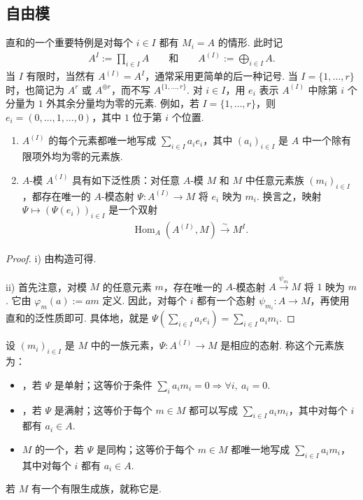 \subsection{自由模}\label{sec:galois-1-3-6}
直和的一个重要特例是对每个 $i\in I$ 都有 $M_i=A$ 的情形. 此时记
\begin{align*}
A^I:=\prod_{i\in I}A\qquad\text{和}\qquad A^{(I)}:=\bigoplus_{i\in I}A.
\end{align*}
当 $I$ 有限时，当然有 $A^{(I)}=A^I$，通常采用更简单的后一种记号. 当 $I=\{1,\ldots,r\}$ 时，也简记为 $A^r$ 或 $A^{\oplus r}$，而不写 $A^{\{1,\ldots,r\}}$. 对 $i\in I$，用 $e_i$ 表示 $A^{(I)}$ 中除第 $i$ 个分量为 $1$ 外其余分量均为零的元素. 例如，若 $I=\{1,\ldots,r\}$，则 $e_i=(0,\ldots,1,\ldots,0)$，其中 $1$ 位于第 $i$ 个位置.
\begin{proposition*}
\begin{enumerate}[label=\roman*)]
\item $A^{(I)}$ 的每个元素都唯一地写成 $\sum_{i\in I}a_ie_i$，其中 $(a_i)_{i\in I}$ 是 $A$ 中一个除有限项外均为零的元素族.
\item $A$-模 $A^{(I)}$ 具有如下泛性质：对任意 $A$-模 $M$ 和 $M$ 中任意元素族 $(m_i)_{i\in I}$，都存在唯一的 $A$-模态射 $\Psi\colon A^{(I)}\longrightarrow M$ 将 $e_i$ 映为 $m_i$. 换言之，映射 $\Psi\mapsto(\Psi(e_i))_{i\in I}$ 是一个双射
\begin{align*}
\operatorname{Hom}_A(A^{(I)},M)\xrightarrow{\sim}M^I.
\end{align*}
\end{enumerate}
\end{proposition*}
\begin{proof}
i) 由构造可得.

ii) 首先注意，对模 $M$ 的任意元素 $m$，存在唯一的 $A$-模态射 $A\xrightarrow{\psi_m}M$ 将 $1$ 映为 $m$. 它由 $\varphi_m(a):=am$ 定义. 因此，对每个 $i$ 都有一个态射 $\psi_{m_i}\colon A\longrightarrow M$，再使用直和的泛性质即可. 具体地，就是 $\Psi(\sum_{i\in I}a_ie_i)=\sum_{i\in I}a_im_i$.
\end{proof}
\begin{definition*}
设 $(m_i)_{i\in I}$ 是 $M$ 中的一族元素，$\Psi\colon A^{(I)}\longrightarrow M$ 是相应的态射. 称这个元素族为：
\begin{itemize}
\item {}，若 $\Psi$ 是单射；这等价于条件 $\sum_i a_im_i=0\Rightarrow\forall i,\ a_i=0$.
\item {}，若 $\Psi$ 是满射；这等价于每个 $m\in M$ 都可以写成 $\sum_{i\in I}a_im_i$，其中对每个 $i$ 都有 $a_i\in A$.
\item $M$ 的一个，若 $\Psi$ 是同构；这等价于每个 $m\in M$ 都唯一地写成 $\sum_{i\in I}a_im_i$，其中对每个 $i$ 都有 $a_i\in A$.
\end{itemize}
若 $M$ 有一个有限生成族，就称它是.
\end{definition*}
